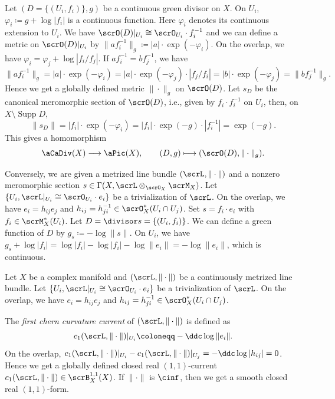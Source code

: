 \begin{construction}[label=\labelNFM{constr:map-from-divisor-to-line-bundle-and-metric-to-forms}, status=draft, tag=0000000]
		Let $(D = \{(U_i,f_i)\},g)$ be a continuous green divisor on $X$.
    On $U_i$, $\varphi_i \coloneqq g + \log|f_i|$ is a continuous function.
Here $\varphi_i$ denotes its continuous extension to $U_i$.
    We have $\scrO(D)|_{U_i} \cong \scrO_{U_i} \cdot f_i^{-1}$ and we can define a metric on $\scrO(D)|_{U_i}$ by $\|a f_i^{-1}\|_g \coloneqq |a|\cdot \exp(-\varphi_i)$.
    On the overlap, we have $\varphi_i = \varphi_j + \log |f_i/f_j|$.
    If $af_i^{-1} = bf_j^{-1}$, we have
    \[ \|a f_i^{-1}\|_g = |a|\cdot \exp(-\varphi_i) = |a| \cdot \exp(-\varphi_j) \cdot |f_j/f_i| = |b| \cdot \exp(-\varphi_j) = \|b f_j^{-1}\|_g. \]
    Hence we get a globally defined metric $\|\cdot\|_g$ on $\scrO(D)$.
    Let $s_D$ be the canonical meromorphic section of $\scrO(D)$, i.e., given by $f_i \cdot f_i^{-1}$ on $U_i$, then, on $X\setminus\operatorname{Supp}D$,
    \[ \|s_D\| = |f_i| \cdot \exp(-\varphi_i) = |f_i| \cdot \exp(-g) \cdot |f_i^{-1}| = \exp(-g). \]
    This gives a homomorphism
    \begin{equation}\label{eq:green-divisor-to-metrized-line-bundles}
      \aCaDiv(X) \longrightarrow \aPic(X), \qquad (D,g) \longmapsto (\scrO(D),\|\cdot\|_g).
    \end{equation}

    Conversely, we are given a metrized line bundle $(\scrL,\|\cdot\|)$ and a nonzero meromorphic section $s \in \Gamma(X,\scrL \otimes _{\scrO_X}\scrM_X)$.
    Let $\{U_i,\scrL|_{U_i} \cong \scrO_{U_i}\cdot e_i\}$ be a trivialization of $\scrL$.
    On the overlap, we have $e_i = h_{ij} e_j$ and $h_{ij} = h_{ji}^{-1} \in \scrO_{X}^*(U_i \cap U_j)$.
    Set $s = f_i \cdot e_i$ with $f_i \in \scrM_X^*(U_i)$.
    Let $D = \divisor s = \{(U_i,f_i)\}$.
    We can define a green function of $D$ by $g_s \coloneqq - \log \|s\|$.
    On $U_i$, we have $g_s + \log |f_i| = \log |f_i| - \log |f_i| - \log \|e_i\| = -\log \|e_i\|$, which is continuous.
\end{construction}

\begin{construction}[label=\labelNFM{constr:curvature-form-of-line-bundle}, status=draft, tag=0000000]
  Let $X$ be a complex manifold and $(\scrL, \|\cdot\|)$ be a continuously metrized line bundle.
  Let $\{U_i,\scrL|_{U_i} \cong \scrO_{U_i}\cdot e_i\}$ be a trivialization of $\scrL$.
    On the overlap, we have $e_i = h_{ij} e_j$ and $h_{ij} = h_{ji}^{-1} \in \scrO_{X}^*(U_i \cap U_j)$.

  The \emph{first chern curvature current} of $(\scrL, \|\cdot\|)$ is defined as
  \[ c_1(\scrL, \|\cdot\|)|_{U_i} \coloneqq - \ddc \log \|e_i\|. \]
  On the overlap, $c_1(\scrL, \|\cdot\|)|_{U_i} - c_1(\scrL, \|\cdot\|)|_{U_j} = -\ddc \log |h_{ij}| = 0$.
  Hence we get a globally defined closed real $(1,1)$-current $c_1(\scrL, \|\cdot\|) \in \scrB_X^{1,1}(X)$.
  If $\|\cdot\|$ is $\cinf$, then we get a smooth closed real $(1,1)$-form.
\end{construction}

